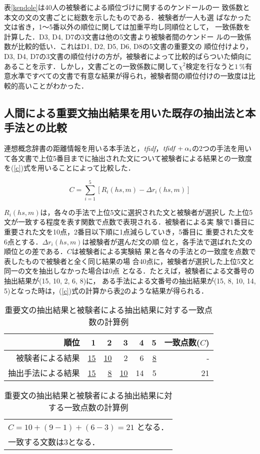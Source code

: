 表\ref{kendole}は40人の被験者による順位づけに関するのケンドールの一
致係数と本文の文の文書ごとに総数を示したものである．被験者が一人も選
ばなかった文は省き，1〜5番以外の順位に関しては加重平均し同順位として，
一致係数を計算した．D3, D4, D7の3文書は他の5文書より被験者間のケンドー
ルの一致係数が比較的低い．これはD1, D2, D5, D6, D8の5文書の重要文の
順位付けより，D3, D4, D7の3文書の順位付けの方が，被験者によって比較的ばらついた傾向にあることを示す．しかし，文書ごとの一致係数に関して$\chi^2$検定を行なうと$1$\,$\%$有意水準ですべての文書で有意な結果が得られ，被験者間の順位付けの一致度は比較的高いことがわかった．


\subsection{人間による重要文抽出結果を用いた既存の抽出法と本手法との比較}

連想概念辞書の距離情報を用いる本手法と，{\it tfidf}，${\it tfidf}+\alpha_{i}$の2つの手法を用いて各文書で上位5番目までに抽出された文について被験者による結果との一致度を(\ref{c})式を用いることによって比較した．

\begin{equation}
\label{c}
C=\sum^{5}_{i=1} [ R_{i}(hs, m) - \Delta r_{i}(hs, m) ] 
\end{equation}

$R_{i}(hs, m)$は，各々の手法で上位5文に選択された文と被験者が選択し
た上位5文が一致する程度を表す関数で点数で表現される．被験者による実
験で1番目に重要された文を10点，2番目以下順に1点減らしていき，5番目に
重要された文を6点とする．$\Delta r_{i}(hs, m)$は被験者が選んだ文の順
位と，各手法で選ばれた文の順位との差である．$C$は被験者による実験結
果と各々の手法との一致度を点数で表したもので被験者と全く同じ結果の場
合40点に，被験者が選択した上位5文と同一の文を抽出しなかった場合は0点
となる．たとえば，被験者による文番号の抽出結果が(15, 10, 2, 6, 8)に，
ある手法による文番号の抽出結果が(15, 8, 10, 14, 5)となった時は，(\ref{c})式の計算から表\ref{c-example}のような結果が得られる．


\begin{table}[htb]
\begin{center}
\caption{重要文の抽出結果と被験者による抽出結果に対する一致点数の計算例}
\label{c-example}

\vspace*{1ex}

\begin{tabular}{|r||r|r|r|r|r||r|} \hline
順位&1&2&3&4&5&一致点数($C$)\\ \hline
被験者による結果&\underline{15}&\underline{10}&2&6&\underline{8}&-\\ \hline
抽出手法による結果&\underline{15}&\underline{8}&\underline{10}&14&5&21\\ \hline
\end{tabular}

\begin{tabular}{l}
$C = 10+(9-1)+(6-3) = 21$ となる．\\
一致する文数は3となる．\\
\end{tabular}
\end{center}
\end{table}


